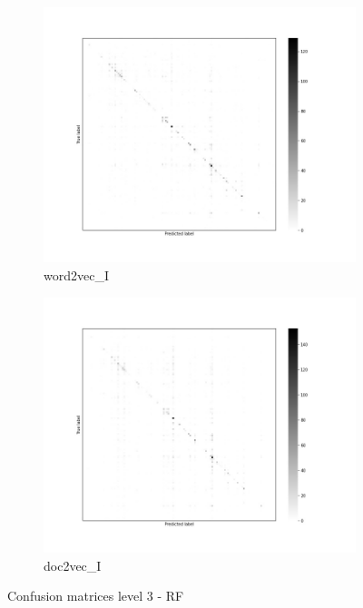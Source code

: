 \documentclass[12pt, a4paper, titlepage]{article}
\begin{document}
\begin{figure}
  \begin{subfigure}[b]{0.475\textwidth}   
    \centering 
    \includegraphics[width=\textwidth]{cm_word2vec_without_RF_3.jpg}
    {{\small word2vec\_I}}    
  \end{subfigure}
  \hfill
  \begin{subfigure}[b]{0.475\textwidth}   
      \centering 
      \includegraphics[width=\textwidth]{cm_doc2vec_without_RF_3.jpg}
      {{\small doc2vec\_I}}    
  \end{subfigure}
  \caption{\label{fig: F22} Confusion matrices level 3 - RF}
\end{figure}
\end{document}
